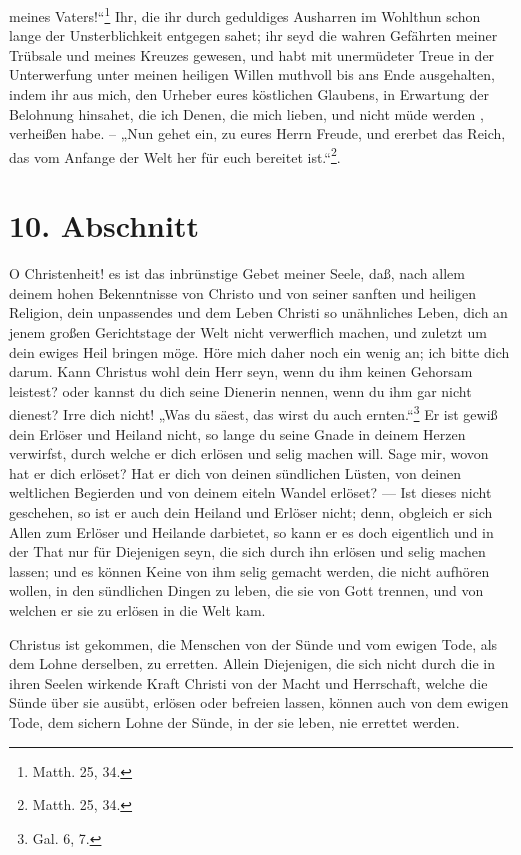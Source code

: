 meines Vaters!“\footnote{Matth. 25, 34.} Ihr, die ihr durch geduldiges Ausharren im Wohlthun schon lange der Unsterblichkeit entgegen sahet; ihr seyd die wahren Gefährten meiner Trübsale und meines Kreuzes gewesen, und habt mit unermüdeter Treue in der Unterwerfung unter meinen heiligen Willen muthvoll bis ans Ende ausgehalten, indem ihr aus mich, den Urheber eures köstlichen Glaubens, in Erwartung der Belohnung hinsahet, die ich Denen, die mich lieben, und nicht müde werden , verheißen habe. – „Nun gehet ein, zu eures Herrn Freude, und ererbet das Reich, das vom Anfange der Welt her für euch bereitet ist.“\footnote{Matth. 25, 34.}.

\section{10. Abschnitt}

O Christenheit! es ist das inbrünstige Gebet meiner Seele, daß, nach allem deinem hohen Bekenntnisse von Christo und von seiner sanften und heiligen Religion, dein unpassendes und dem Leben Christi so unähnliches Leben, dich an jenem großen Gerichtstage der Welt nicht verwerflich machen, und zuletzt um dein ewiges Heil bringen möge. Höre mich daher noch ein wenig an; ich bitte dich darum. Kann Christus wohl dein Herr seyn, wenn du ihm keinen Gehorsam leistest? oder kannst du dich seine Dienerin nennen, wenn du ihm gar nicht dienest? Irre dich nicht! „Was du säest, das wirst du auch ernten.“\footnote{Gal. 6, 7.} Er ist gewiß dein Erlöser und Heiland nicht, so lange du seine Gnade in deinem Herzen verwirfst, durch welche er dich erlösen und selig machen will. Sage mir, wovon hat er dich erlöset? Hat er dich von deinen sündlichen Lüsten, von deinen weltlichen Begierden und von deinem eiteln Wandel erlöset? — Ist dieses nicht geschehen, so ist er auch dein Heiland und Erlöser nicht; denn, obgleich er sich Allen zum Erlöser und Heilande darbietet, so kann er es doch eigentlich und in der That nur für Diejenigen seyn, die sich durch ihn erlösen und selig machen lassen; und es können Keine von ihm selig gemacht werden, die nicht aufhören wollen, in den sündlichen Dingen zu leben, die sie von Gott trennen, und von welchen er sie zu erlösen in die Welt kam.

Christus ist gekommen, die Menschen von der Sünde und vom ewigen Tode, als dem Lohne derselben, zu erretten. Allein Diejenigen, die sich nicht durch die in ihren Seelen wirkende Kraft Christi von der Macht und Herrschaft, welche die Sünde über sie ausübt, erlösen oder befreien lassen, können auch von dem ewigen Tode, dem sichern Lohne der Sünde, in der sie leben, nie errettet werden.

